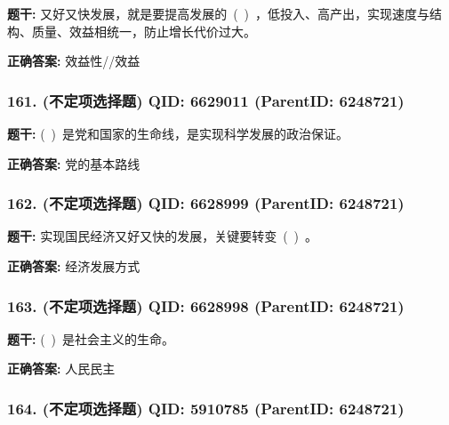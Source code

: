 \documentclass[12pt,UTF8]{ctexart}
\begin{document}
\textbf{题干:}
又好又快发展，就是要提高发展的 ( ) ，低投入、高产出，实现速度与结构、质量、效益相统一，防止增长代价过大。



\textbf{正确答案:}
效益性//效益

\vspace{0.3em}\hrulefill\vspace{0.7em}

\subsubsection*{161. (不定项选择题) \small QID: 6629011 (ParentID: 6248721)}

\textbf{题干:}
( ) 是党和国家的生命线，是实现科学发展的政治保证。



\textbf{正确答案:}
党的基本路线

\vspace{0.3em}\hrulefill\vspace{0.7em}

\subsubsection*{162. (不定项选择题) \small QID: 6628999 (ParentID: 6248721)}

\textbf{题干:}
实现国民经济又好又快的发展，关键要转变 ( ) 。



\textbf{正确答案:}
经济发展方式

\vspace{0.3em}\hrulefill\vspace{0.7em}

\subsubsection*{163. (不定项选择题) \small QID: 6628998 (ParentID: 6248721)}

\textbf{题干:}
( ) 是社会主义的生命。



\textbf{正确答案:}
人民民主

\vspace{0.3em}\hrulefill\vspace{0.7em}

\subsubsection*{164. (不定项选择题) \small QID: 5910785 (ParentID: 6248721)}
\end{document}
